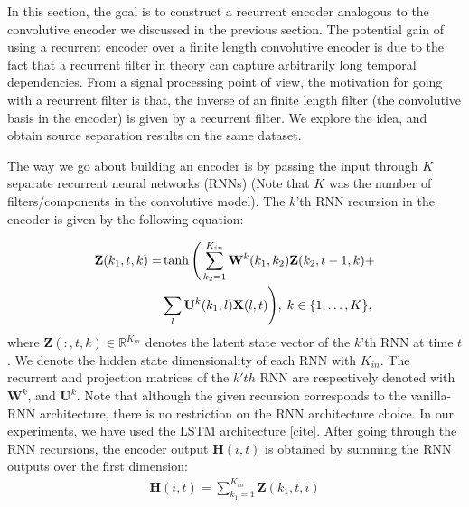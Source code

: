 \documentclass{article}
\begin{document}
In this section, the goal is to construct a recurrent encoder analogous to the convolutive encoder we discussed in the previous section. The potential gain of using a recurrent encoder over a finite length convolutive encoder is due to the fact that a recurrent filter in theory can capture arbitrarily long temporal dependencies. From a signal processing point of view, the motivation for going with a recurrent filter is that, the inverse of an finite length filter (the convolutive basis in the encoder) is given by a recurrent filter. We explore the idea, and obtain source separation results on the same dataset.  

The way we go about building an encoder is by passing the input through $K$ separate recurrent neural networks (RNNs) (Note that $K$ was the number of filters/components in the convolutive model). The $k$'th RNN recursion in the encoder is given by the following equation:    

\begin{align}
  \mathbf Z(k_1, t, k) =& \tanh \Bigg( \sum_{k_2 = 1}^{K_{in}} \mathbf W^k(k_1,k_2 ) \mathbf Z(k_2, t-1, k) + \notag \\
  & \hspace{0cm} \sum_l \mathbf U^k(k_1,l) \mathbf X(l, t) \Bigg),\; k \in \{1,\dots,K\}, 
\end{align}
where $\mathbf Z(:, t, k) \in \mathbb R^{K_{in}}$ denotes the latent state vector of the $k$'th RNN at time $t$. We denote the hidden state dimensionality of each RNN with $K_{in}$. The recurrent and projection matrices of the $k'th$ RNN are respectively denoted with $\mathbf W^k$, and $\mathbf U^k$. Note that although the given recursion corresponds to the vanilla-RNN architecture, there is no restriction on the RNN architecture choice. In our experiments, we have used the LSTM architecture [cite]. After going through the RNN recursions, the encoder output $\mathbf H(i, t)$ is obtained by summing the RNN outputs over the first dimension:
\begin{align}
  \mathbf H(i, t) = \sum_{k_1=1}^{K_{in}} \mathbf Z(k_1, t, i)
\end{align}


\end{document}
